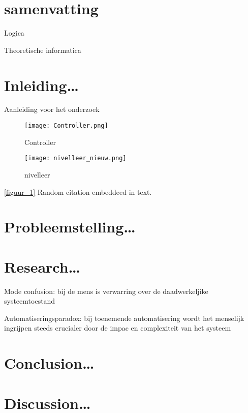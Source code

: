 \documentclass[a4paper,12pt]{article}
\begin{document}
\section{samenvatting}

Logica

Theoretische informatica



\section{Inleiding\dots}
Aanleiding voor het onderzoek
\begin{figure}
    \centering
    \texttt{[image: Controller.png]}
    \caption{Controller}
    \label{fig:figuur_1}
\end{figure}

\begin{figure}
    \centering
    \texttt{[image: nivelleer\_nieuw.png]}
    \caption{nivelleer}
    \label{fig:figuur_2}
\end{figure}

\ref{figuur_1}
Random citation \cite{Nobody06} embeddeed in text.
\section{Probleemstelling\dots}
\section{Research\dots}

Mode confusion: bij de mens is verwarring over de daadwerkeljike systeemtoestand

Automatiseringsparadox: bij toenemende automatisering wordt het menselijk ingrijpen steeds crucialer door de impac en complexiteit van het systeem

\section{Conclusion\dots}\newpage
\section{Discussion\dots}
{}

\end{document}
